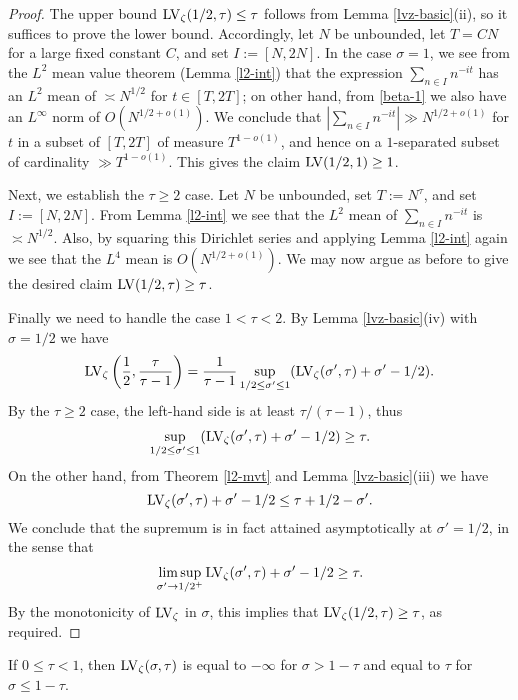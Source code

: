 \begin{proof}  The upper bound $\mathrm{LV}_\zeta(1/2,\tau) \leq \tau$  follows from Lemma \ref{lvz-basic}(ii), so it suffices to prove the lower bound.  Accordingly, let $N$ be unbounded, let $T  = CN$ for a large fixed constant $C$, and set $I := [N,2N]$.  In the case $\sigma=1$, we see from the $L^2$ mean value theorem (Lemma \ref{l2-int}) that the expression $\sum_{n \in I} n^{-it}$ has an $L^2$ mean of $\asymp N^{1/2}$ for $t \in [T,2T]$; on other hand, from \eqref{beta-1} we also have an $L^\infty$ norm of $O(N^{1/2+o(1)})$.  We conclude that $|\sum_{n \in I} n^{-it}| \gg N^{1/2+o(1)}$ for $t$ in a subset of $[T,2T]$ of measure $T^{1-o(1)}$, and hence on a $1$-separated subset of cardinality $\gg T^{1-o(1)}$.  This gives the claim $\mathrm{LV}(1/2,1) \geq 1$.

    Next, we establish the $\tau \geq 2$ case.
    Let $N$ be unbounded, set $T := N^\tau$, and set $I := [N,2N]$.  From Lemma \ref{l2-int} we see that the $L^2$ mean of $\sum_{n \in I} n^{-it}$ is $\asymp N^{1/2}$.  Also, by squaring this Dirichlet series and applying Lemma \ref{l2-int} again we see that the $L^4$ mean is $O(N^{1/2+o(1)})$.  We may now argue as before to give the desired claim $\mathrm{LV}(1/2,\tau) \geq \tau$.

    Finally we need to handle the case $1 < \tau < 2$. By Lemma \ref{lvz-basic}(iv) with $\sigma=1/2$ we have
    $$ \mathrm{LV}_\zeta\left(\frac{1}{2}, \frac{\tau}{\tau-1}\right) = \frac{1}{\tau-1}  \sup_{1/2 \leq \sigma' \leq 1} (\mathrm{LV}_\zeta(\sigma',\tau) + \sigma'-1/2).$$
    By the $\tau \geq 2$ case, the left-hand side is at least $\tau/(\tau-1)$, thus
    $$ \sup_{1/2 \leq \sigma' \leq 1} (\mathrm{LV}_\zeta(\sigma',\tau) + \sigma'-1/2) \geq \tau.$$
    On the other hand, from Theorem \ref{l2-mvt} and Lemma \ref{lvz-basic}(iii) we have
    $$ \mathrm{LV}_\zeta(\sigma',\tau) + \sigma'-1/2 \leq \tau + 1/2 - \sigma'.$$
    We conclude that the supremum is in fact attained asymptotically at $\sigma'=1/2$, in the sense that
    $$ \limsup_{\sigma' \to 1/2^+} \mathrm{LV}_\zeta(\sigma',\tau) + \sigma'-1/2 \geq \tau.$$
    By the monotonicity of $\mathrm{LV}_\zeta$ in $\sigma$, this implies that $\mathrm{LV}_\zeta(1/2,\tau) \geq \tau$, as required.
\end{proof}

\begin{lemma}\label{lvz-small-tau} If $0 \leq \tau < 1$, then $\mathrm{LV}_\zeta(\sigma,\tau)$ is equal to $-\infty$ for $\sigma > 1-\tau$ and equal to $\tau$ for $\sigma \leq 1-\tau$.
\end{lemma}

